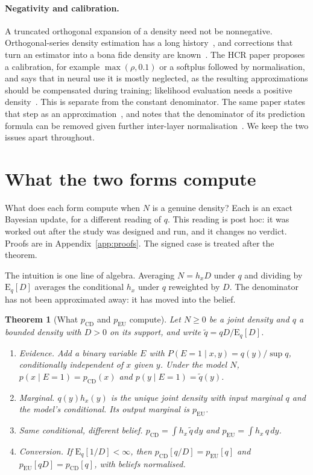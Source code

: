 \documentclass[10pt,a4paper]{article}
\newcommand{\pcd}{p_{\mathrm{CD}}}
\newcommand{\peu}{p_{\mathrm{EU}}}
\newcommand{\Eq}{\mathrm{E}_q}
\theoremstyle{upright}
\newtheorem{theorem}{Theorem}
\begin{document}
\paragraph{Negativity and calibration.} A truncated orthogonal expansion of a density need not be nonnegative. Orthogonal-series density estimation has a long history~\citep{cencov1962evaluation,schwartz1967estimation,kronmal1968estimation,efromovich2010orthogonal}, and corrections that turn an estimator into a bona fide density are known~\citep{gajek1986improving,glad2003correction}. The HCR paper proposes a calibration, for example $\max(\rho,0.1)$ or a softplus followed by normalisation, and says that in neural use it is mostly neglected, as the resulting approximations should be compensated during training; likelihood evaluation needs a positive density~\citep[Secs.~II-A, IV]{duda2024biology}. This is separate from the constant denominator. The same paper states that step as an approximation~\citep[Sec.~II-C]{duda2024biology}, and notes that the denominator of its prediction formula can be removed given further inter-layer normalisation~\citep[Sec.~II-B]{duda2024biology}. We keep the two issues apart throughout.

\section{What the two forms compute}\label{sec:semantics}

What does each form compute when $N$ is a genuine density? Each is an exact Bayesian update, for a different reading of $q$. This reading is post hoc: it was worked out after the study was designed and run, and it changes no verdict. Proofs are in Appendix~\ref{app:proofs}. The signed case is treated after the theorem.

The intuition is one line of algebra. Averaging $N=h_xD$ under $q$ and dividing by $\Eq[D]$ averages the conditional $h_x$ under $q$ reweighted by $D$. The denominator has not been approximated away: it has moved into the belief.

\begin{theorem}[What $\pcd$ and $\peu$ compute]\label{thm:sem}
Let $N\geq0$ be a joint density and $q$ a bounded density with $D>0$ on its support, and write $\tilde q=qD/\Eq[D]$.
\begin{enumerate}[label=(\alph*)]
\item \emph{Evidence.} Add a binary variable $E$ with $P(E=1\mid x,y)=q(y)/\sup q$, conditionally independent of $x$ given $y$. Under the model $N$, $p(x\mid E=1)=\pcd(x)$ and $p(y\mid E=1)=\tilde q(y)$.
\item \emph{Marginal.} $q(y)h_x(y)$ is the unique joint density with input marginal $q$ and the model's conditional. Its output marginal is $\peu$.
\item \emph{Same conditional, different belief.} $\pcd=\int h_x\,\tilde q\,dy$ and $\peu=\int h_x\,q\,dy$.
\item \emph{Conversion.} If $\Eq[1/D]<\infty$, then $\pcd[q/D]=\peu[q]$ and $\peu[qD]=\pcd[q]$, with beliefs normalised.
\end{enumerate}
\end{theorem}
\end{document}

